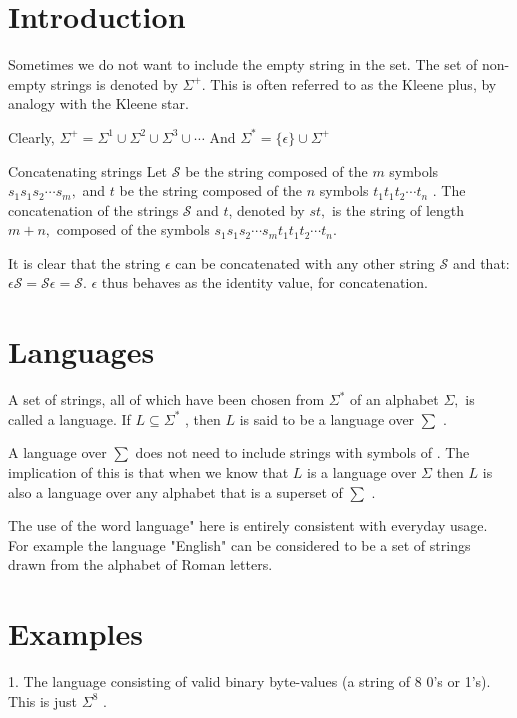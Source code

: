 \documentclass{article}
\begin{document}
\section*{Introduction}
Sometimes we do not want to include the empty string in the set. The set of non-empty strings is denoted by $\Sigma^{+}$. This is often referred to as the Kleene plus, by analogy with the Kleene star.

Clearly, $\Sigma^{+}=\Sigma^{1} \cup\Sigma^{2} \cup\Sigma^{3} \cup\cdots$ 
And $\Sigma^{*}=\{\epsilon\} \cup\Sigma^{+}$ 

Concatenating strings
Let $\mathcal{S}$ be the string composed of the $m$ symbols $s_{1} s_{1} s_{2} \cdots s_{m},$ and $t$ be the string composed of the  $n$ symbols $t_{1} t_{1} t_{2} \cdots t_{n}$ . The concatenation of the strings $\mathcal{S}$ and $t$, denoted by $s t,$ is the string of length $m+n,$ composed of the symbols $s_{1} s_{1} s_{2} \cdots s_{m} t_{1} t_{1} t_{2} \cdots t_{n}.$ 

It is clear that the string $\epsilon$ can be concatenated with any other string $\mathcal{S}$ and that: $\epsilon\mathcal{S}=\mathcal{S}\epsilon=\mathcal{S}$. $\epsilon$ thus behaves as the identity value, for concatenation.

\section*{Languages}

A set of strings, all of which have been chosen from $\Sigma^{*}$ of an alphabet $\Sigma,$ is called a language. If $L \subseteq\Sigma^{*}$ , then $L$ is said to be a language over $\sum$ .

A language over $\sum$ does not need to include strings with  symbols of . The implication of this is that when we know that $L$ is a language over $\Sigma$ then $L$ is also a language over any alphabet that is a superset of $\sum$ .

The use of the word language" here is entirely consistent with everyday usage. For example the language "English" can be considered to be a set of strings drawn from the alphabet of Roman letters.

\section*{Examples}

1. The language consisting of valid binary byte-values (a string of 8 0's or 1's). This is just $\Sigma^{8}$ .
\end{document}
